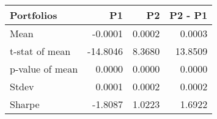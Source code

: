 \begin{tabular}{lrrr}
\toprule
Portfolios & P1 & P2 & P2 - P1 \\
\midrule
Mean & -0.0001 & 0.0002 & 0.0003 \\
t-stat of mean & -14.8046 & 8.3680 & 13.8509 \\
p-value of mean & 0.0000 & 0.0000 & 0.0000 \\
Stdev & 0.0001 & 0.0002 & 0.0002 \\
Sharpe & -1.8087 & 1.0223 & 1.6922 \\
\bottomrule
\end{tabular}
